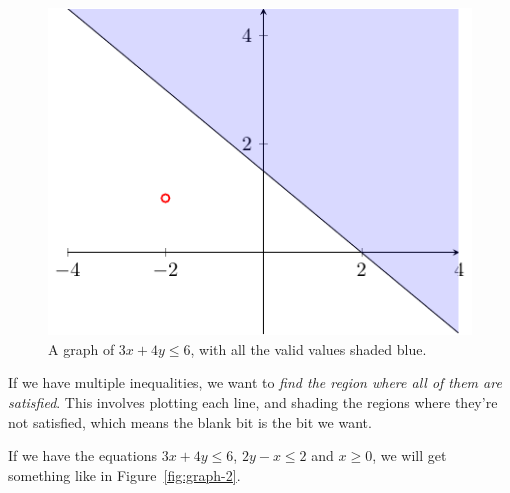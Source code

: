 \begin{figure}[h]
  \centering
  \includegraphics{diagrams/graph1}
  \caption{A graph of $3x + 4y \leq 6$, with all the valid values shaded blue.}
  \label{fig:graph-1}
\end{figure}

If we have multiple inequalities, we want to \textit{find the region where all
of them are satisfied}. This involves plotting each line, and shading the
regions where they're not satisfied, which means the blank bit is the bit we
want.

If we have the equations $3x + 4y \leq 6$, $2y - x \leq 2$ and $x \geq 0$, we
will get something like in Figure~\ref{fig:graph-2}.


